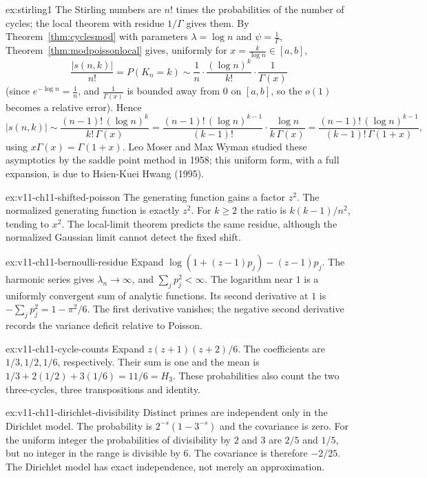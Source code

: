\begin{solution}{ex:stirling1}
\idea The Stirling numbers are $n!$ times the probabilities of the number of cycles; the local theorem with residue $1/\Gamma$ gives them.
\writeup By Theorem~\ref{thm:cyclesmod} with parameters $\lambda=\log n$ and $\psi=\frac1\Gamma$, Theorem~\ref{thm:modpoissonlocal} gives, uniformly for $x=\frac k{\log n}\in[a,b]$,
\[
\frac{|s(n,k)|}{n!}=P(K_n=k)\sim\frac1n\cdot\frac{(\log n)^k}{k!}\cdot\frac1{\Gamma(x)}
\]
(since $e^{-\log n}=\frac1n$, and $\frac1{\Gamma(x)}$ is bounded away from $0$ on $[a,b]$, so the $o(1)$ becomes a relative error). Hence
\[
|s(n,k)|\sim\frac{(n-1)!\,(\log n)^k}{k!\,\Gamma(x)}=\frac{(n-1)!\,(\log n)^{k-1}}{(k-1)!}\cdot\frac{\log n}{k\,\Gamma(x)}=\frac{(n-1)!\,(\log n)^{k-1}}{(k-1)!\,\Gamma(1+x)},
\]
using $x\Gamma(x)=\Gamma(1+x)$. Leo Moser and Max Wyman studied these asymptotics by the saddle point method in 1958; this uniform form, with a full expansion, is due to Hsien-Kuei Hwang (1995).
\end{solution}

\begin{solution}{ex:v11-ch11-shifted-poisson}
\idea The generating function gains a factor $z^2$.
\writeup The normalized generating function is exactly $z^2$. For $k\ge2$ the ratio is $k(k-1)/n^2$, tending to $x^2$. The local-limit theorem predicts the same residue, although the normalized Gaussian limit cannot detect the fixed shift.
\end{solution}

\begin{solution}{ex:v11-ch11-bernoulli-residue}
\idea Expand $\log(1+(z-1)p_j)-(z-1)p_j$.
\writeup The harmonic series gives $\lambda_n\to\infty$, and $\sum_jp_j^2<\infty$. The logarithm near $1$ is a uniformly convergent sum of analytic functions. Its second derivative at $1$ is $-\sum_jp_j^2=1-\pi^2/6$. The first derivative vanishes; the negative second derivative records the variance deficit relative to Poisson.
\end{solution}

\begin{solution}{ex:v11-ch11-cycle-counts}
\idea Expand $z(z+1)(z+2)/6$.
\writeup The coefficients are $1/3,1/2,1/6$, respectively. Their sum is one and the mean is $1/3+2(1/2)+3(1/6)=11/6=H_3$. These probabilities also count the two three-cycles, three transpositions and identity.
\end{solution}

\begin{solution}{ex:v11-ch11-dirichlet-divisibility}
\idea Distinct primes are independent only in the Dirichlet model.
\writeup The probability is $2^{-s}(1-3^{-s})$ and the covariance is zero. For the uniform integer the probabilities of divisibility by $2$ and $3$ are $2/5$ and $1/5$, but no integer in the range is divisible by $6$. The covariance is therefore $-2/25$. The Dirichlet model has exact independence, not merely an approximation.
\end{solution}

